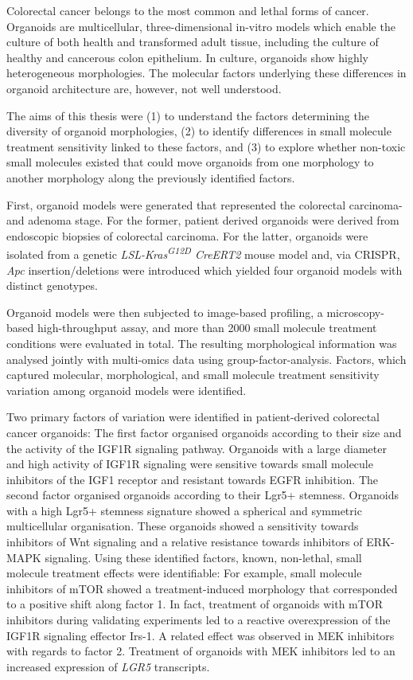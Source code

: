 Colorectal cancer belongs to the most common and lethal forms of cancer. Organoids are multicellular, three-dimensional in-vitro models which enable the culture of both health and transformed adult tissue, including the culture of healthy and cancerous colon epithelium. In culture, organoids show highly heterogeneous morphologies. The molecular factors underlying these differences in organoid architecture are, however, not well understood. 
\bigbreak

The aims of this thesis were (1) to understand the factors determining the diversity of organoid morphologies, (2) to identify differences in small molecule treatment sensitivity linked to these factors, and (3) to explore whether non-toxic small molecules existed that could move organoids from one morphology to another morphology along the previously identified factors.
\bigbreak

First, organoid models were generated that represented the colorectal carcinoma- and adenoma stage. For the former, patient derived organoids were derived from endoscopic biopsies of colorectal carcinoma. For the latter, organoids were isolated from a genetic \textit{LSL-Kras\textsuperscript{G12D} CreERT2} mouse model and, via CRISPR, \textit{Apc} insertion/deletions were introduced which yielded four organoid models with distinct genotypes.
\bigbreak

Organoid models were then subjected to image-based profiling, a microscopy-based high-throughput assay, and more than 2000 small molecule treatment conditions were evaluated in total. The resulting morphological information was analysed jointly with multi-omics data using group-factor-analysis. Factors, which captured molecular, morphological, and small molecule treatment sensitivity variation among organoid models were identified.
\bigbreak

Two primary factors of variation were identified in patient-derived colorectal cancer organoids: The first factor organised organoids according to their size and the activity of the IGF1R signaling pathway. Organoids with a large diameter and high activity of IGF1R signaling were sensitive towards small molecule inhibitors of the IGF1 receptor and resistant towards EGFR inhibition. 
\smallbreak
The second factor organised organoids according to their Lgr5+ stemness. Organoids with a high Lgr5+ stemness signature showed a spherical and symmetric multicellular organisation. These organoids showed a sensitivity towards inhibitors of Wnt signaling and a relative resistance towards inhibitors of ERK-MAPK signaling.
\smallbreak
Using these identified factors, known, non-lethal, small molecule treatment effects were identifiable: For example, small molecule inhibitors of mTOR showed a treatment-induced morphology that corresponded to a positive shift along factor 1. In fact, treatment of organoids with mTOR inhibitors during validating experiments led to a reactive overexpression of the IGF1R signaling effector Irs-1. A related effect was observed in MEK inhibitors with regards to factor 2. Treatment of organoids with MEK inhibitors led to an increased expression of \textit{LGR5} transcripts.
\bigbreak

